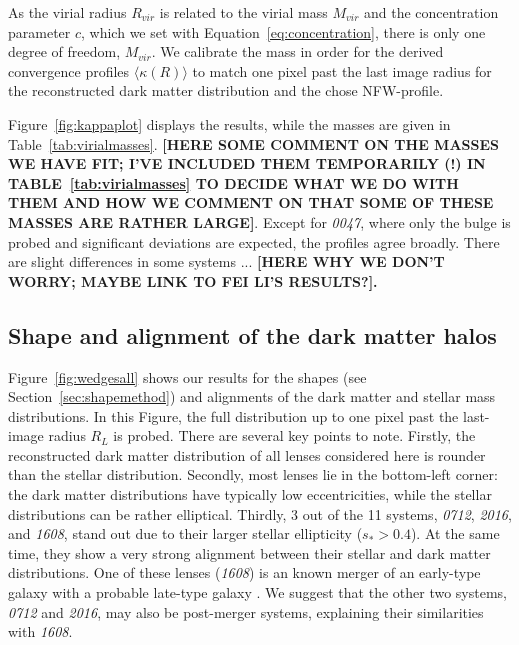 \documentclass[useAMS,usenatbib]{mn2e}
\begin{document}
As the virial radius $R_{vir}$ is related to the virial mass $M_{vir}$ and the concentration parameter $c$, which we set with Equation~\ref{eq:concentration}, there is only one degree of freedom, $M_{vir}$. We calibrate the mass in order for the derived convergence profiles $\langle\kappa(R)\rangle$ to match one pixel past the last image radius for the reconstructed dark matter distribution and the chose NFW-profile.

Figure~\ref{fig:kappaplot} displays the results, while the masses are given in Table~\ref{tab:virialmasses}. \textbf{[HERE SOME COMMENT ON THE MASSES WE HAVE FIT; I'VE INCLUDED THEM TEMPORARILY (!) IN TABLE~\ref{tab:virialmasses} TO DECIDE WHAT WE DO WITH THEM AND HOW WE COMMENT ON THAT SOME OF THESE MASSES ARE RATHER LARGE]}. Except for \textit{0047}, where only the bulge is probed and significant deviations are expected, the profiles agree broadly. There are slight differences in some systems ... \textbf{[HERE WHY WE DON'T WORRY; MAYBE LINK TO FEI LI'S RESULTS?].}

\subsection{Shape and alignment of the dark matter halos}
Figure~\ref{fig:wedgesall} shows our results for the shapes (see Section~\ref{sec:shapemethod}) and alignments of the dark matter and stellar mass distributions. In this Figure, the full distribution up to one pixel past the last-image radius $R_{L}$ is probed. There are several key points to note. Firstly, the reconstructed dark matter distribution of all lenses considered here is rounder than the stellar distribution. Secondly, most lenses lie in the bottom-left corner: the dark matter distributions have typically low eccentricities, while the stellar distributions can be rather elliptical. Thirdly, 3 out of the 11 systems, {\it0712}, {\it2016}, and {\it1608}, stand out due to their larger stellar ellipticity ($s_* > 0.4$). At the same time, they show a very strong alignment between their stellar and dark matter distributions. One of these lenses ({\it1608}) is an known merger of an early-type galaxy with a probable late-type galaxy \citep{2003ApJ...584..100S}. We suggest that the other two systems, {\it0712} and {\it2016}, may also be post-merger systems, explaining their similarities with {\it1608}.
\end{document}
